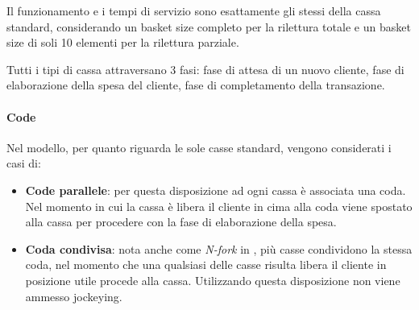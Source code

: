 \begin{enumerate}
Il funzionamento e i tempi di servizio sono esattamente gli stessi della cassa standard, considerando un basket size completo per la rilettura totale e un basket size di soli 10 elementi per la rilettura parziale.
\end{enumerate}

Tutti i tipi di cassa attraversano 3 fasi: fase di attesa di un nuovo cliente, fase di elaborazione della spesa del cliente, fase di completamento della transazione.

\paragraph{Code}
Nel modello, per quanto riguarda le sole casse standard, vengono considerati i casi di:

\begin{itemize}
\item \textbf{Code parallele}: per questa disposizione ad ogni cassa è
  associata una coda. Nel momento in cui la cassa è libera il cliente in
  cima alla coda viene spostato alla cassa per procedere con la fase
  di elaborazione della spesa.
\item \textbf{Coda condivisa}: nota anche come \textit{N-fork} in \cite{yanagisawa2011methods}, più casse condividono la stessa coda, nel momento che una qualsiasi delle casse risulta libera il cliente in posizione utile procede alla cassa. Utilizzando questa disposizione non viene ammesso jockeying.
\end{itemize}

